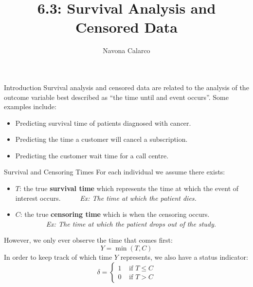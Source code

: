 \documentclass[
  ignorenonframetext,
  aspectratio=169,
]{beamer}
\title{6.3: Survival Analysis and Censored Data}
\author{Navona Calarco}
\date{}
\institute{The University of Toronto}
\begin{document}
\frame{\titlepage}
\ifdefined\Shaded\renewenvironment{Shaded}{\begin{tcolorbox}[interior hidden, breakable, boxrule=0pt, enhanced, borderline west={3pt}{0pt}{shadecolor}, frame hidden, sharp corners]}{\end{tcolorbox}}\fi

\begin{frame}{Introduction}
\protect\hypertarget{introduction}{}
Survival analysis and censored data are related to the analysis of the
outcome variable best described as ``the time until and event occurs''.
Some examples include:

\begin{itemize}
\item
  Predicting survival time of patients diagnosed with cancer.
\item
  Predicting the time a customer will cancel a subscription.
\item
  Predicting the customer wait time for a call centre.
\end{itemize}
\end{frame}

\begin{frame}{Survival and Censoring Times}
\protect\hypertarget{survival-and-censoring-times}{}
For each individual we assume there exists:

\begin{itemize}
\item
  \(T\): the true \textbf{survival time} which represents the time at
  which the event of interest occurs. ~~~~~\emph{Ex: The time at which
  the patient dies.}
\item
  \(C\): the true \textbf{censoring time} which is when the censoring
  occurs. ~~~~~~~~~\emph{Ex: The time at which the patient drops out of
  the study.}
\end{itemize}

However, we only ever observe the time that comes first:
\[Y=\min (T, C)\] In order to keep track of which time \(Y\) represents,
we also have a status indicator: \[
\delta=\left\{\begin{array}{ll}
1 & \text { if } T \leq C \\
0 & \text { if } T>C
\end{array}\right.\]
\end{frame}
\end{document}
